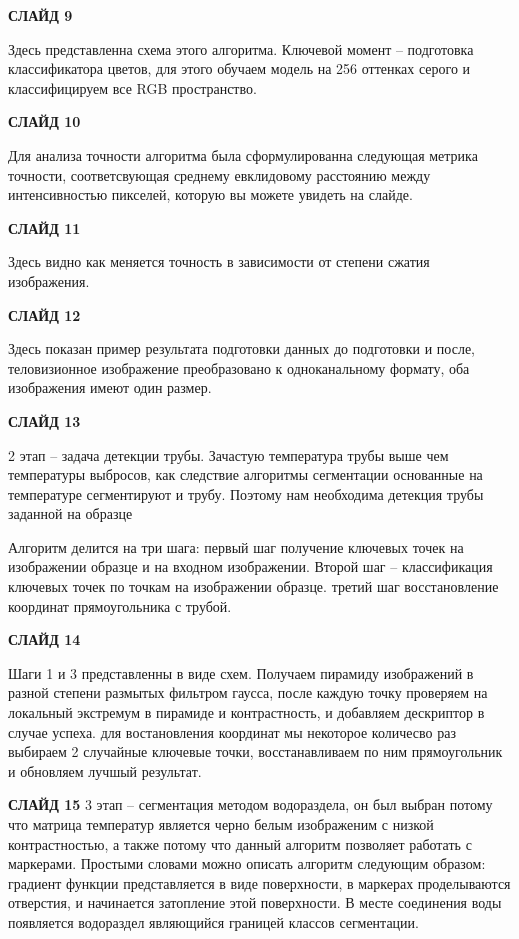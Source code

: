 \documentclass[14pt, a4paper]{extreport}
\begin{document}
	\textbf{СЛАЙД 9}
	
	Здесь представленна схема этого алгоритма. Ключевой момент -- подготовка классификатора цветов, для этого обучаем модель на 256 оттенках серого и классифицируем все RGB пространство. 
	
	\textbf{СЛАЙД 10}
	
	Для анализа точности алгоритма была сформулированна следующая метрика точности, соответсвующая среднему евклидовому расстоянию между интенсивностью пикселей, которую вы можете увидеть на слайде. 
	
	\textbf{СЛАЙД 11}
	
	Здесь видно как меняется точность в зависимости от степени сжатия изображения.
	
	\textbf{СЛАЙД 12}
	
	Здесь показан пример результата подготовки данных до подготовки и после, теловизионное изображение преобразовано к одноканальному формату, оба изображения имеют один размер.
	
	\textbf{СЛАЙД 13}
	
	2 этап -- задача детекции трубы. Зачастую температура трубы выше чем температуры выбросов, как следствие алгоритмы сегментации основанные на температуре сегментируют и трубу. Поэтому нам необходима детекция трубы заданной на образце
	
	 Алгоритм делится на три шага: первый шаг получение ключевых точек на изображении образце и на входном изображении. Второй шаг -- классификация ключевых точек по точкам на изображении образце. третий шаг восстановление координат прямоугольника с трубой. 
	 
	 \textbf{СЛАЙД 14}
	 
	 Шаги 1 и 3 представленны в виде схем. Получаем пирамиду изображений в разной степени размытых фильтром гаусса, после каждую точку проверяем на локальный экстремум в пирамиде и контрастность, и добавляем дескриптор в случае успеха.
	 для востановления координат мы некоторое количесво раз выбираем 2 случайные ключевые точки, восстанавливаем по ним прямоугольник и обновляем лучшый результат.
	 
	 \textbf{СЛАЙД 15}
 	3 этап -- сегментация методом водораздела, он был выбран потому что матрица температур является черно белым изображеним с низкой контрастностью, а также потому что данный алгоритм позволяет работать с маркерами. Простыми словами можно описать алгоритм следующим образом: градиент функции представляется в виде поверхности, в маркерах проделываются отверстия, и начинается затопление этой поверхности. В месте соединения воды появляется водораздел являющийся границей классов сегментации.
	 
\end{document}
